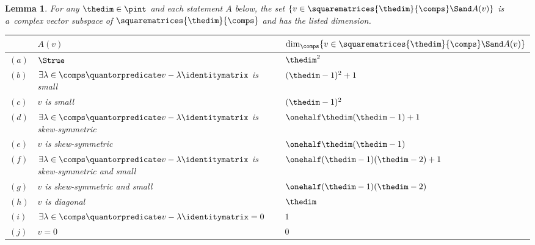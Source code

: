 \documentclass[pdftex]{sigma}
\numberwithin{equation}{section}
\newtheorem{Lemma}[Theorem]{Lemma}
\begin{document}
{
  \newcommand{\somespace}{V}
  \newcommand{\themat}{v}
  \newcommand{\theshortpredicate}{A}
  \newcommand{\theshortpredicatex}[1]{\theshortpredicate(#1)}
    \newcommand{\thesum}{\lambda}
    \newcommand{\theid}{\identitymatrix}
    \begin{Lemma}
      \label{lemma:dimensions}
For any $\thedim\in\pint$ and each statement $\theshortpredicate$  below, the set $\{\themat\in\squarematrices{\thedim}{\comps}\Sand \theshortpredicatex{\themat}\}$ is a~complex vector subspace of $\squarematrices{\thedim}{\comps}$ and has the listed dimension.
    \begin{table}[h]\centering\renewcommand{\arraystretch}{1.2}
      \begin{tabular}{ll|l}
&        $\theshortpredicatex{\themat}$ & $\dim_\comps\{\themat\in\squarematrices{\thedim}{\comps}\Sand \theshortpredicatex{\themat}\}$\\[0.1em] \hline
$(a)$  &      $\Strue$& $\thedim^2$ \Tstrut\\
$(b)$ & $\exists \thesum\in\comps\quantorpredicate \themat-\thesum\theid$ is small                                  &$(\thedim-1)^2+1$ \\
$(c)$ & $\themat$ is small                                  &$(\thedim-1)^2$ \\
$(d)$ & $\exists \thesum\in\comps\quantorpredicate \themat-\thesum\theid$ is skew-symmetric                                  &$\onehalf\thedim(\thedim-1)+1$ \\
$(e)$ &              $\themat$ is skew-symmetric                    &$\onehalf\thedim(\thedim-1)$ \\
$(f)$ & $\exists \thesum\in\comps\quantorpredicate \themat-\thesum\theid$ is skew-symmetric and small                                  &$\onehalf(\thedim-1)(\thedim-2)+1$ \\
$(g)$ & $\themat$     is skew-symmetric and small                             &$\onehalf(\thedim-1)(\thedim-2)$ \\
$(h)$ &        $\themat$  is diagonal& $\thedim$ \\
$(i)$ & $\exists \thesum\in\comps\quantorpredicate \themat-\thesum\theid=0$                                 & $1$ \\
$(j)$ & $\themat=0$        & $0$
    \end{tabular}
    \end{table}
  \end{Lemma}

}
\end{document}
